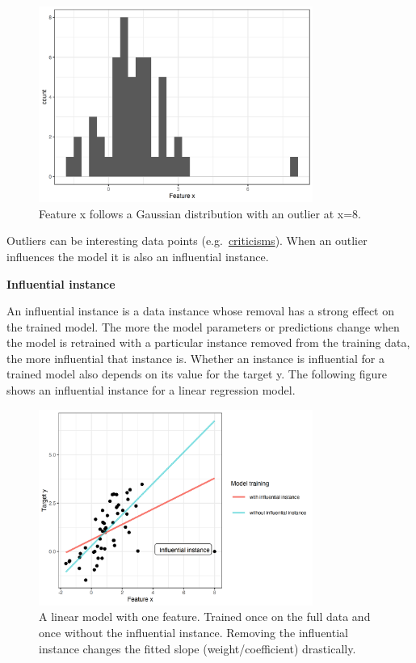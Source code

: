 \documentclass[
  10pt,
]{scrbook}
\begin{document}
\begin{figure}

{\centering \includegraphics[width=0.8\textwidth]{images/outlier-1} 

}

\caption{Feature x follows a Gaussian distribution with an outlier at x=8.}\label{fig:outlier}
\end{figure}

Outliers can be interesting data points (e.g.~\protect\hyperlink{proto}{criticisms}).
When an outlier influences the model it is also an influential instance.

\textbf{Influential instance}

An influential instance is a data instance whose removal has a strong effect on the trained model.
The more the model parameters or predictions change when the model is retrained with a particular instance removed from the training data, the more influential that instance is. Whether an instance is influential for a trained model also depends on its value for the target y.
The following figure shows an influential instance for a linear regression model.

\begin{figure}

{\centering \includegraphics[width=0.8\textwidth]{images/influential-point-1} 

}

\caption{A linear model with one feature. Trained once on the full data and once without the influential instance. Removing the influential instance changes the fitted slope (weight/coefficient) drastically.}\label{fig:influential-point}
\end{figure}
\end{document}
